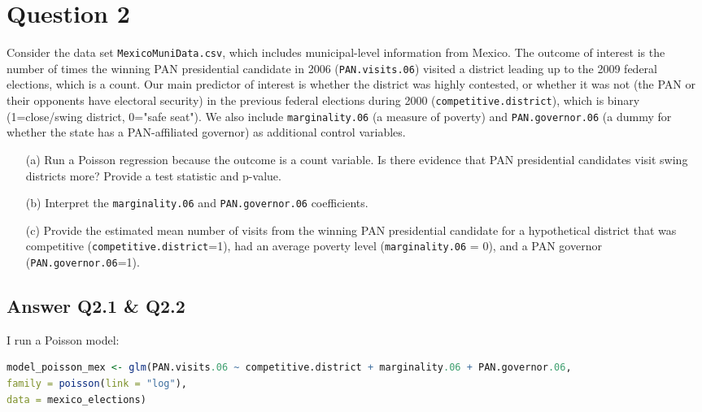 \documentclass[12pt,letterpaper]{article}
\begin{document}
\section*{Question 2} 
\vspace{.25cm}

\noindent Consider the data set \texttt{MexicoMuniData.csv}, which includes municipal-level information from Mexico. The outcome of interest is the number of times the winning PAN presidential candidate in 2006 (\texttt{PAN.visits.06}) visited a district leading up to the 2009 federal elections, which is a count. Our main predictor of interest is whether the district was highly contested, or whether it was not (the PAN or their opponents have electoral security) in the previous federal elections during 2000 (\texttt{competitive.district}), which is binary (1=close/swing district, 0="safe seat"). We also include \texttt{marginality.06} (a measure of poverty) and \texttt{PAN.governor.06} (a dummy for whether the state has a PAN-affiliated governor) as additional control variables. 

\begin{enumerate}
	\item [(a)]
	Run a Poisson regression because the outcome is a count variable. Is there evidence that PAN presidential candidates visit swing districts more? Provide a test statistic and p-value.

	\item [(b)]
	Interpret the \texttt{marginality.06} and \texttt{PAN.governor.06} coefficients.
	
	\item [(c)]
	Provide the estimated mean number of visits from the winning PAN presidential candidate for a hypothetical district that was competitive (\texttt{competitive.district}=1), had an average poverty level (\texttt{marginality.06} = 0), and a PAN governor (\texttt{PAN.governor.06}=1).
	
\end{enumerate}

\subsection*{Answer Q2.1 \& Q2.2}

I run a Poisson model:

	\begin{lstlisting}[language=R]
model_poisson_mex <- glm(PAN.visits.06 ~ competitive.district + marginality.06 + PAN.governor.06, 
family = poisson(link = "log"), 
data = mexico_elections)
\end{lstlisting}
\end{document}
